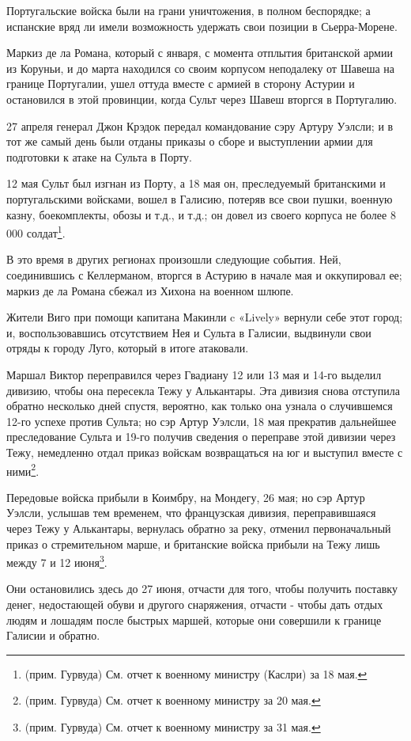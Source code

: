 \documentclass[
  oneside,
  12pt,
  titlepage]{book}
\begin{document}
Португальские войска были на грани уничтожения, в полном беспорядке; а испанские вряд ли имели возможность удержать свои позиции в Сьерра-Морене.

Маркиз де ла Романа, который с января, с момента отплытия британской армии из Коруньи, и до марта находился со своим корпусом неподалеку от Шавеша на границе Португалии, ушел оттуда вместе с армией в сторону Астурии и остановился в этой провинции, когда Сульт через Шавеш вторгся в Португалию.

27 апреля генерал Джон Крэдок передал командование сэру Артуру Уэлсли; и в тот же самый день были отданы приказы о сборе и выступлении армии для подготовки к атаке на Сульта в Порту.

12 мая Сульт был изгнан из Порту, а 18 мая он, преследуемый британскими и португальскими войсками, вошел в Галисию, потеряв все свои пушки, военную казну, боекомплекты, обозы и т.д., и т.д.; он довел из своего корпуса не более 8 000 солдат\footnote{(прим. Гурвуда) См. отчет к военному министру (Каслри) за 18 мая.}.

В это время в других регионах произошли следующие события. Ней, соединившись с Келлерманом, вторгся в Астурию в начале мая и оккупировал ее; маркиз де ла Романа сбежал из Хихона на военном шлюпе.

Жители Виго при помощи капитана Макинли c «Lively» вернули себе этот город; и, воспользовавшись отсутствием Нея и Сульта в Галисии, выдвинули свои отряды к городу Луго, который в итоге атаковали.

Маршал Виктор переправился через Гвадиану 12 или 13 мая и 14-го выделил дивизию, чтобы она пересекла Тежу у Алькантары. Эта дивизия снова отступила обратно несколько дней спустя, вероятно, как только она узнала о случившемся 12-го успехе против Сульта; но сэр Артур Уэлсли, 18 мая прекратив дальнейшее преследование Сульта и 19-го получив сведения о переправе этой дивизии через Тежу, немедленно отдал приказ войскам возвращаться на юг и выступил вместе с ними\footnote{(прим. Гурвуда) См. отчет к военному министру за 20 мая.}.

Передовые войска прибыли в Коимбру, на Мондегу, 26 мая; но сэр Артур Уэлсли, услышав тем временем, что французская дивизия, переправившаяся через Тежу у Алькантары, вернулась обратно за реку, отменил первоначальный приказ о стремительном марше, и британские войска прибыли на Тежу лишь между 7 и 12 июня\footnote{(прим. Гурвуда) См. отчет к военному министру за 31 мая.}.

Они остановились здесь до 27 июня, отчасти для того, чтобы получить поставку денег, недостающей обуви и другого снаряжения, отчасти - чтобы дать отдых людям и лошадям после быстрых маршей, которые они совершили к границе Галисии и обратно.
\end{document}
